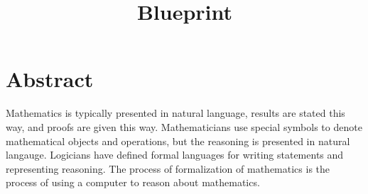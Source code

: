 \title{Blueprint} 




\maketitle


\tableofcontents
\section{Abstract}
Mathematics is typically presented in natural language, results are stated this way, and proofs are given this way. Mathematicians use special symbols to denote mathematical objects and operations, but the reasoning is presented in natural langauge. Logicians have defined formal languages for writing statements and representing reasoning. The process of formalization of mathematics is the process of using a computer to reason about mathematics.
